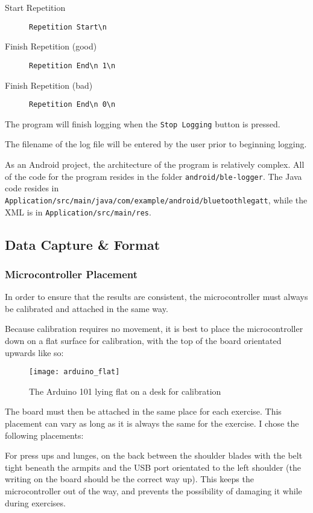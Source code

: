 \documentclass[a4paper]{article}
\begin{document}
\begin{description}
\item[Start Repetition] \lstinline|Repetition Start\n|
\item[Finish Repetition (good)] \lstinline|Repetition End\n 1\n|
\item[Finish Repetition (bad)] \lstinline|Repetition End\n 0\n|
\end{description}

The program will finish logging when the \lstinline{Stop Logging} button is pressed.

The filename of the log file will be entered by the user prior to beginning logging.

As an Android project, the architecture of the program is relatively complex. All of the code for the program resides in the folder \lstinline{android/ble-logger}. The Java code resides in \lstinline{Application/src/main/java/com/example/android/bluetoothlegatt}, while the XML is in \lstinline{Application/src/main/res}. 

\newpage
\subsection{Data Capture \& Format}%
\label{subsec:dc_datacapture}

\subsubsection{Microcontroller Placement}
\label{subsubsec:dc_dc_placement}

In order to ensure that the results are consistent, the microcontroller must always be calibrated and attached in the same way.

Because calibration requires no movement, it is best to place the microcontroller down on a flat surface for calibration, with the top of the board orientated upwards like so:

\begin{figure}[H]
    \centering
        \texttt{[image: arduino\_flat]}
        \caption{The Arduino 101 lying flat on a desk for calibration}
        \label{fig:ar_flat}
\end{figure}

The board must then be attached in the same place for each exercise. This placement can vary as long as it is always the same for the exercise. I chose the following placements:

For press ups and lunges, on the back between the shoulder blades with the belt tight beneath the armpits and the USB port orientated to the left shoulder (the writing on the board should be the correct way up). This keeps the microcontroller out of the way, and prevents the possibility of damaging it while during exercises.
\end{document}
